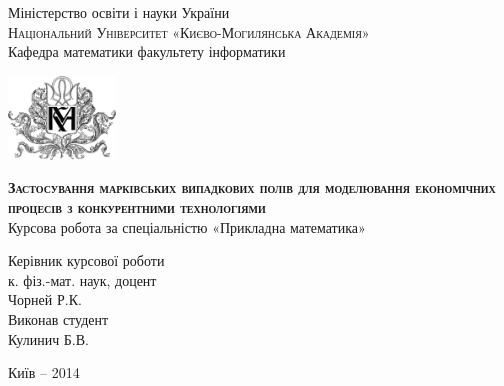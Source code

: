 \begin{titlepage}
\newpage

\begin{center}
Міністерство освіти і науки України \\
\textsc{Національний Університет «Києво-Могилянська Академія»} \\
Кафедра математики факультету інформатики
\end{center}

\vspace{2em}

\centering
\includegraphics[height=6em]{logo}

\vspace{1em}

\begin{center}
\textsc{\textbf{Застосування марківських випадкових полів для моделювання економічних процесів з конкурентними технологіями}} \\
Курсова робота за спеціальністю «Прикладна математика»
\end{center}

\vspace{6em}

\begin{flushright}
Керівник курсової роботи \\
к. фіз.-мат. наук, доцент \\
Чорней Р.К. \\
\vspace{2em}
Виконав студент \\
Кулинич Б.В. \\
\end{flushright}

\vspace{\fill}

\begin{center}
Київ – 2014
\end{center}

\end{titlepage}